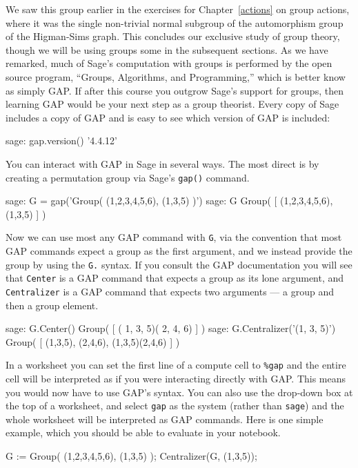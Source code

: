 %
We saw this group earlier in the exercises for Chapter~\ref{actions} on group actions, where it was the single non-trivial normal subgroup of the automorphism group of the Higman-Sims graph.
%
%
This concludes our exclusive study of group theory, though we will be using groups some in the subsequent sections.  As we have remarked, much of Sage's computation with groups is performed by the open source program, ``Groups, Algorithms, and Programming,'' which is better know as simply GAP.  If after this course you outgrow Sage's support for groups, then learning GAP would be your next step as a group theorist. Every copy of Sage includes a copy of GAP and is easy to see which version of GAP is included:
%
\begin{sageexample}
sage: gap.version()
'4.4.12'
\end{sageexample}
%
You can interact with GAP in Sage in several ways. The most direct is by creating a permutation group via Sage's \verb?gap()? command.
%
\begin{sageexample}
sage: G = gap('Group( (1,2,3,4,5,6), (1,3,5) )')
sage: G
Group( [ (1,2,3,4,5,6), (1,3,5) ] )
\end{sageexample}
%
Now we can use most any GAP command with \verb?G?, via the convention that most GAP commands expect a group as the first argument, and we instead provide the group by using the \verb?G.? syntax.  If you consult the GAP documentation you will see that \verb?Center? is a GAP command that expects a group as its lone argument, and \verb?Centralizer? is a GAP command that expects two arguments --- a group and then a group element.
%
\begin{sageexample}
sage: G.Center()
Group( [ ( 1, 3, 5)( 2, 4, 6) ] )
sage: G.Centralizer('(1, 3, 5)')
Group( [ (1,3,5), (2,4,6), (1,3,5)(2,4,6) ] )
\end{sageexample}
%
In a worksheet you can set the first line of a compute cell to \verb?%gap? and the entire cell will be interpreted as if you were interacting directly with GAP.  This means you would now have to use GAP's syntax.  You can also use the drop-down box at the top of a worksheet, and select \verb?gap? as the system (rather than \verb?sage?) and the whole worksheet will be interpreted as GAP commands.  Here is one simple example, which you should be able to evaluate in your notebook.
%
\begin{sageverbatim}
G := Group( (1,2,3,4,5,6), (1,3,5) );
Centralizer(G, (1,3,5));
\end{sageverbatim}
